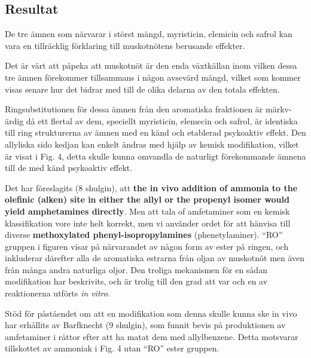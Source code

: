 \documentclass[a4paper,margin=3.25cm]{article}
\begin{document}
{%

	\subsection{Resultat}

	De tre ämnen som närvarar i störst mängd, myristicin, elemicin och safrol kan vara en tillräcklig förklaring till muskotnötens berusande effekter.

	Det är värt att påpeka att muskotnöt är den enda växtkällan inom vilken dessa tre ämnen förekommer tillsammans i någon avsevärd mängd, vilket som kommer visas senare hur det bidrar med till de olika delarna av den totala effekten.

	Ringsubstitutionen för dessa ämnen från den aromatiska fraktionen är märkv-ärdig då ett flertal av dem, speciellt myristicin, elemecin och safrol, är identiska till ring strukturerna av ämnen med en känd och etablerad psykoaktiv effekt. Den allyliska sido kedjan kan enkelt ändras med hjälp av kemisk modifikation, vilket är visat i Fig. 4, detta skulle kunna omvandla de naturligt förekommande ämnena till de med känd psykoaktiv effekt.

	Det har föreslagits (8 shulgin), att \textbf{the in vivo addition
	of ammonia to the olefinic (alken) site in either the allyl or the propenyl isomer would yield amphetamines directly}.
	Men att tala of amfetaminer som en kemisk klassifikation vore inte helt korrekt, men vi använder ordet för att hänvisa till diverse
	\textbf{methoxylated phenyl-isopropylamines} (phenetylaminer).
	``RO'' gruppen i figuren visar på närvarandet av någon form av ester på ringen,
	och inkluderar därefter alla de aromatiska estrarna från oljan av muskotnöt men även
	från många andra naturliga oljor.
	Den troliga mekanismen för en sådan  modifikation har beskrivits,
	och är trolig till den grad att var och en av reaktionerna utförts \textit{in vitro}.

	Stöd för påståendet om att en modifikation som denna skulle kunna ske in vivo har erhållits
	av Barfknecht (9 shulgin), som funnit bevis på produktionen av amfetaminer i råttor
	efter att ha matat dem med allylbenzene. Detta motsvarar tillskottet av
	ammoniak i Fig. 4 utan ``RO'' ester gruppen.




}
\end{document}
